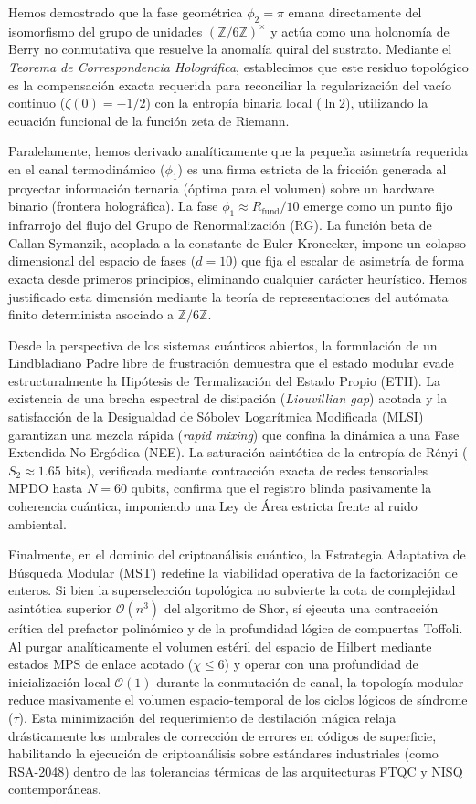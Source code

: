 \documentclass[12pt,a4paper]{article}
\theoremstyle{plain}
\theoremstyle{definition}
\theoremstyle{remark}
\begin{document}
Hemos demostrado que la fase geométrica $\phi_2 = \pi$ emana directamente del isomorfismo del grupo de unidades $(\mathbb{Z}/6\mathbb{Z})^{\times}$ y actúa como una holonomía de Berry no conmutativa que resuelve la anomalía quiral del sustrato. Mediante el \textit{Teorema de Correspondencia Holográfica}, establecimos que este residuo topológico es la compensación exacta requerida para reconciliar la regularización del vacío continuo ($\zeta(0) = -1/2$) con la entropía binaria local ($\ln 2$), utilizando la ecuación funcional de la función zeta de Riemann.

Paralelamente, hemos derivado analíticamente que la pequeña asimetría requerida en el canal termodinámico ($\phi_1$) es una firma estricta de la fricción generada al proyectar información ternaria (óptima para el volumen) sobre un hardware binario (frontera holográfica). La fase $\phi_1 \approx R_{\text{fund}}/10$ emerge como un punto fijo infrarrojo del flujo del Grupo de Renormalización (RG). La función beta de Callan-Symanzik, acoplada a la constante de Euler-Kronecker, impone un colapso dimensional del espacio de fases ($d=10$) que fija el escalar de asimetría de forma exacta desde primeros principios, eliminando cualquier carácter heurístico. Hemos justificado esta dimensión mediante la teoría de representaciones del autómata finito determinista asociado a $\mathbb{Z}/6\mathbb{Z}$.

Desde la perspectiva de los sistemas cuánticos abiertos, la formulación de un Lindbladiano Padre libre de frustración demuestra que el estado modular evade estructuralmente la Hipótesis de Termalización del Estado Propio (ETH). La existencia de una brecha espectral de disipación (\textit{Liouvillian gap}) acotada y la satisfacción de la Desigualdad de Sóbolev Logarítmica Modificada (MLSI) garantizan una mezcla rápida (\textit{rapid mixing}) que confina la dinámica a una Fase Extendida No Ergódica (NEE). La saturación asintótica de la entropía de Rényi ($S_2 \approx 1.65$ bits), verificada mediante contracción exacta de redes tensoriales MPDO hasta $N=60$ qubits, confirma que el registro blinda pasivamente la coherencia cuántica, imponiendo una Ley de Área estricta frente al ruido ambiental.

Finalmente, en el dominio del criptoanálisis cuántico, la Estrategia Adaptativa de Búsqueda Modular (MST) redefine la viabilidad operativa de la factorización de enteros. Si bien la superselección topológica no subvierte la cota de complejidad asintótica superior $\mathcal{O}(n^3)$ del algoritmo de Shor, sí ejecuta una contracción crítica del prefactor polinómico y de la profundidad lógica de compuertas Toffoli. Al purgar analíticamente el volumen estéril del espacio de Hilbert mediante estados MPS de enlace acotado ($\chi \le 6$) y operar con una profundidad de inicialización local $\mathcal{O}(1)$ durante la conmutación de canal, la topología modular reduce masivamente el volumen espacio-temporal de los ciclos lógicos de síndrome ($\tau$). Esta minimización del requerimiento de destilación mágica relaja drásticamente los umbrales de corrección de errores en códigos de superficie, habilitando la ejecución de criptoanálisis sobre estándares industriales (como RSA-2048) dentro de las tolerancias térmicas de las arquitecturas FTQC y NISQ contemporáneas.
\end{document}
